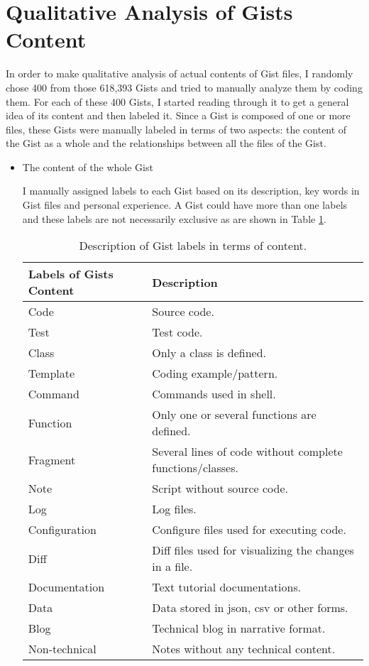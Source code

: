 \section{Qualitative Analysis of Gists Content}

In order to make qualitative analysis of actual contents of Gist files, I randomly chose 400 from those 618,393 Gists and tried to manually analyze them by coding them. For each of these 400 Gists, I started reading through it to get a general idea of its content and then labeled it. Since a Gist is composed of one or more files, these Gists were manually labeled in terms of two aspects: the content of the Gist as a whole and the relationships between all the files of the Gist.  

\begin{itemize}

  \item The content of the whole Gist

  I manually assigned labels to each Gist based on its description, key words in Gist files and personal experience. A Gist could have more than one labels and these labels are not necessarily exclusive as are shown in Table \ref{tb:gistcontentlabels}.

\begin{table}[!htb]
 \begin{center}
 \begin{tabular}{ll} 
   \textbf{Labels of Gists Content}	&	\textbf{Description}\\ \hline
   Code & Source code.\\
   Test & Test code.\\ 
   Class & Only a class is defined.\\ 
   Template & Coding example/pattern.\\ 
   Command & Commands used in shell.\\ 
   Function & Only one or several functions are defined.\\ 
   Fragment & Several lines of code without complete functions/classes.\\
   Note & Script without source code.\\ 
   Log & Log files.\\ 
   Configuration & Configure files used for executing code.\\ 
   Diff & Diff files used for visualizing the changes in a file.\\ 
   Documentation & Text tutorial documentations.\\ 
   Data & Data stored in json, csv or other forms.\\ 
   Blog & Technical blog in narrative format.\\ 
   Non-technical & Notes without any technical content.\\ \hline
 \end{tabular}
 \end{center}
 \caption{Description of Gist labels in terms of content.}
 \label{tb:gistcontentlabels}
\end{table}


\end{itemize}
